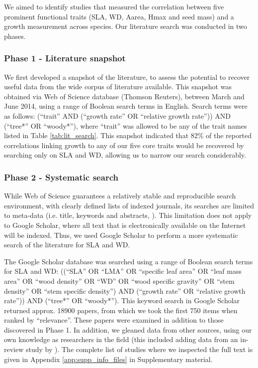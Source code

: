 \documentclass[a4paper,11pt]{article}
\begin{document}
We aimed to identify studies that measured the correlation between five prominent functional traits (SLA, WD, Aarea, Hmax and seed mass) and a growth measurement across species. Our literature search was conducted in two phases.

\subsubsection*{Phase 1 - Literature snapshot}\label{literature-snapshot}

We first developed a snapshot of the literature, to assess the potential to recover useful data from the wide corpus of literature available. This snapshot was obtained via Web of Science database (Thomson Reuters), between March and June 2014, using a range of Boolean search terms in English. Search terms were as follows: (``trait'' AND (``growth rate'' OR ``relative growth rate'')) AND (``tree*'' OR ``woody*''), where ``trait'' was allowed to be any of the trait names listed in Table \ref{tab:lit_search}. This snapshot indicated that 82\% of the reported correlations linking growth to any of our five core traits would be recovered by searching only on SLA and WD, allowing us to narrow our search considerably.

\subsubsection*{Phase 2 - Systematic search}\label{systematic-search}

While Web of Science guarantees a relatively stable and reproducible search environment, with clearly defined lists of indexed journals, its searches are limited to meta-data (i.e. title, keywords and abstracts, \citealt{Beckmann:2012hn}). This limitation does not apply to Google Scholar, where all text that is electronically available on the Internet will be indexed. Thus, we used Google Scholar to perform a more systematic search of the literature for SLA and WD.

The Google Scholar database was searched using a range of Boolean search terms for SLA and WD: ((``SLA'' OR ``LMA'' OR ``specific leaf area'' OR ``leaf mass area'' OR ``wood density'' OR ``WD'' OR ``wood specific gravity'' OR ``stem density'' OR ``stem specific density'') AND (``growth rate'' OR ``relative growth rate'')) AND (``tree*'' OR ``woody*''). This keyword search in Google Scholar returned approx. 18900 papers, from which we took the first 750 items when ranked by ``relevance''.
These papers were examined in addition to those discovered in Phase 1. In addition, we gleaned data from other sources, using our own knowledge as researchers in the field (this included adding data from an in-review study by \citeauthor{Gleason:2016}). The complete list of studies where we inspected the full text is given in Appendix \ref{app:supp_info_files} in Supplementary material.
\end{document}
